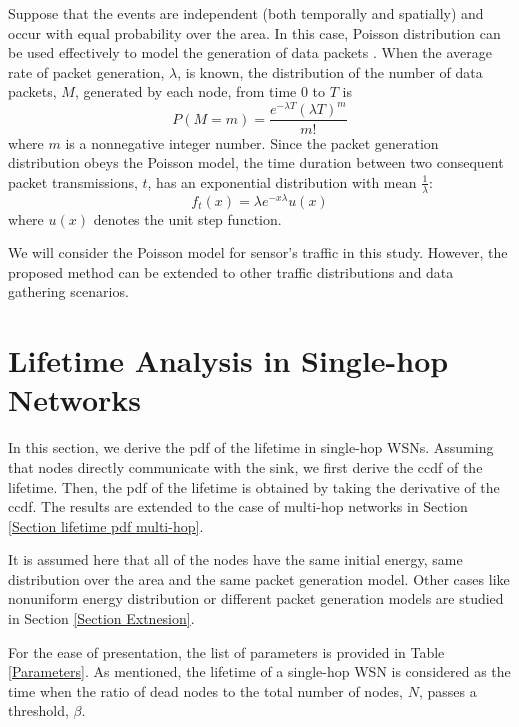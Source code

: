 \documentclass[conference]{IEEEtran}
\begin{document}
Suppose that the events are independent (both temporally and
spatially) and occur with equal probability over the area. In this
case, Poisson distribution can be used effectively to model the
generation of data packets \cite{Rai_Lifetime_Modeling_DATE}. When
the average rate of packet generation, $\lambda$, is known, the
distribution of the number of data packets, $M$, generated by each
node, from time 0 to $T$ is
\begin{equation} \label{Packet generation model Poisson}
P(M=m) = \frac{e^{-\lambda T} (\lambda T)^m}{m!}
\end{equation}
where $m$ is a nonnegative integer number. Since the packet
generation distribution obeys the Poisson model, the time duration
between two consequent packet transmissions, $t$, has an exponential
distribution with mean $\frac{1}{\lambda}$:
\begin{equation} \label{Packet generation model Exp}
f_t(x)= \lambda e^{-x\lambda} u(x)
\end{equation}
where $u(x)$ denotes the unit step function.

We will consider the Poisson model for sensor's traffic in this
study. However, the proposed method can be extended to other traffic
distributions and data gathering scenarios.
\section{Lifetime Analysis in Single-hop Networks}\label{Section Prob Model Single Hop}
In this section, we derive the pdf of the lifetime in single-hop
WSNs. Assuming that nodes directly communicate with the sink, we
first derive the ccdf of the lifetime. Then, the pdf of the lifetime
is obtained by taking the derivative of the ccdf. The results are
extended to the case of multi-hop networks in Section \ref{Section
lifetime pdf multi-hop}.

It is assumed here that all of the nodes have the same initial
energy, same distribution over the area and the same packet
generation model. Other cases like nonuniform energy distribution or
different packet generation models are studied in Section
\ref{Section Extnesion}.

For the ease of presentation, the list of parameters is provided in
Table \ref{Parameters}. As mentioned, the lifetime of a single-hop
WSN is considered as the time when the ratio of dead nodes to the
total number of nodes, $N$, passes a threshold, $\beta$.
\end{document}
